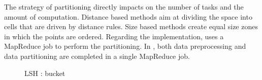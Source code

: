  
The strategy of partitioning directly impacts on the number of tasks and the amount of computation. Distance based 
methods aim at dividing the space into cells that are driven by distance rules. Size based methods create equal size 
zones in which the points are ordered.
Regarding the implementation, \cite{Lu:2012:EPK:2336664.2336674} uses a MapReduce job to 
perform the partitioning. In \cite{Zhang:2012:EPK:2247596.2247602}, both data preprocessing and data partitioning are completed in a single MapReduce job.

\begin{figure}[h]
\centering
{}
\caption{LSH : bucket \label{lsh_partition_figure}}
\end{figure}

